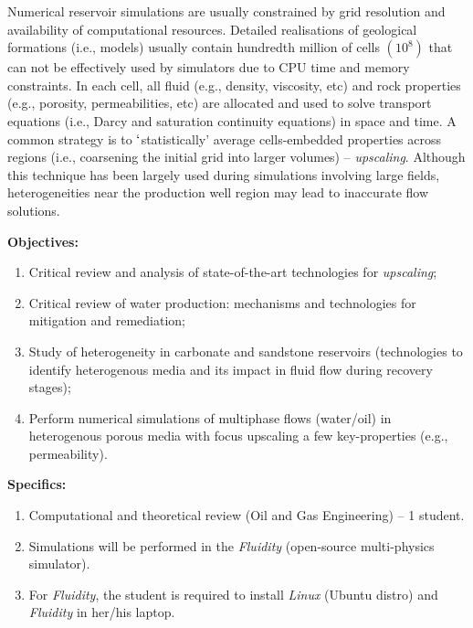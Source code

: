 \documentclass[12pts,a4paper,amsmath,amssymb,floatfix]{article}%
\begin{document}
\begin{enumerate}[label=\bfseries Project:]
Numerical reservoir simulations are usually constrained by grid resolution and availability of computational resources. Detailed realisations of geological formations (i.e., models) usually contain hundredth million of cells $\left(\text{10}^{8}\right)$ that can not be effectively used by simulators due to CPU time and memory constraints.  In each cell, all fluid (e.g., density, viscosity, etc) and rock properties (e.g., porosity, permeabilities, etc) are allocated and used to solve transport equations (i.e., Darcy and saturation continuity equations) in space and time. A common strategy is to $\lq$statistically' average cells-embedded properties across regions (i.e., coarsening the initial grid into larger volumes) -- {\it upscaling}.  Although this technique has been largely used during simulations involving large fields, heterogeneities near the production well region may lead to inaccurate flow solutions. 


\noindent
{\bf Objectives:}
\begin{enumerate}
\item Critical review and analysis of state-of-the-art technologies for {\it upscaling};
\item Critical review of water production: mechanisms and technologies for mitigation and remediation;
\item Study of heterogeneity in carbonate and sandstone reservoirs (technologies to identify heterogenous media and its impact in fluid flow during recovery stages);
\item Perform numerical simulations of multiphase flows (water/oil) in heterogenous porous media with focus upscaling a few key-properties (e.g., permeability).  
\end{enumerate}

\noindent
{\bf Specifics:} 
\begin{enumerate}
\item Computational and theoretical review (Oil and Gas Engineering) -- 1 student. 
\item Simulations will be performed in the {\it Fluidity} (open-source multi-physics simulator). 
\item For {\it Fluidity}, the student is required to install {\it Linux} (Ubuntu distro) and {\it Fluidity} in her/his laptop. 
\end{enumerate}



\end{enumerate}
\end{document}
